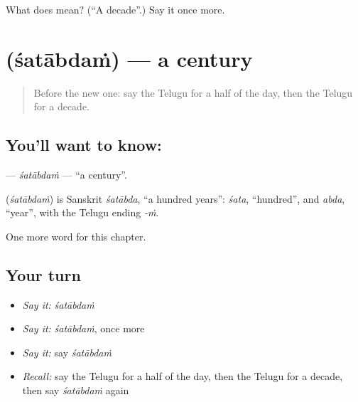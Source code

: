 \begin{tcolorbox}[breakable,colback=teal!4,colframe=teal!35!black,title={Before you move on}]
What does  mean? (\textquotedblleft{}A decade\textquotedblright{}.) Say it once more.
\end{tcolorbox}
\section[\texorpdfstring{\te{శతాబ్దం} (śatābdaṁ)}{శతాబ్దం (śatābdaṁ)}]{ (śatābdaṁ) — a century}

\label{lesson:TE-C290-satabdam}



\begin{quote}
Before the new one: say the Telugu for a half of the day, then the Telugu for a decade.
\end{quote}

\subsection*{You'll want to know: }
\textbf{} — \emph{śatābdaṁ} — \textquotedblleft{}a century\textquotedblright{}.

\begin{cousinweb}
\textbf{} (\emph{śatābdaṁ}) is Sanskrit \emph{śatābda}, \textquotedblleft{}a hundred years\textquotedblright{}: \emph{śata}, \textquotedblleft{}hundred\textquotedblright{}, and \emph{abda}, \textquotedblleft{}year\textquotedblright{}, with the Telugu ending \emph{-ṁ}.
\end{cousinweb}

\begin{grammarlens}[title={What you've built}]
One more word for this chapter.
\end{grammarlens}

\subsection*{Your turn}
\begin{itemize}
\raggedright
  \item \emph{Say it:} \emph{śatābdaṁ}
  \item \emph{Say it:} \emph{śatābdaṁ}, once more
  \item \emph{Say it:} say \emph{śatābdaṁ}
  \item \emph{Recall:} say the Telugu for a half of the day, then the Telugu for a decade, then say \emph{śatābdaṁ} again
\end{itemize}

